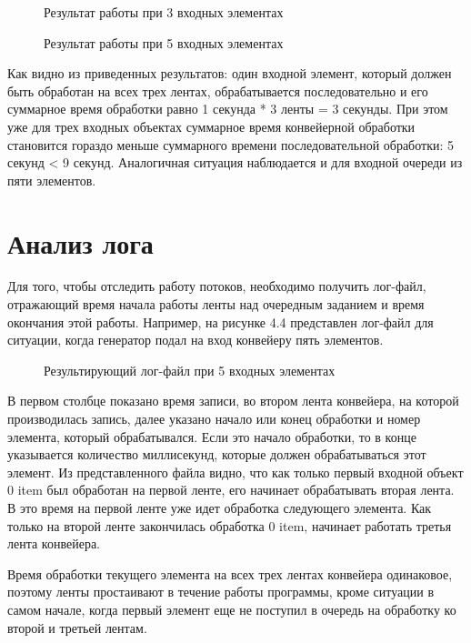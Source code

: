 \documentclass[a4paper,12pt]{report}
\begin{document}
\begin{figure}[ht!]
\caption{Результат работы при 3 входных элементах}
\end{figure}

\begin{figure}[ht!]
\caption{Результат работы при 5 входных элементах}
\end{figure}

Как видно из приведенных результатов: один входной элемент, который должен быть обработан на всех трех лентах, обрабатывается последовательно и его суммарное время обработки равно 1 секунда * 3 ленты = 3 секунды. При этом уже для трех входных объектах суммарное время конвейерной обработки становится гораздо меньше суммарного времени последовательной обработки: 5 секунд < 9 секунд. Аналогичная ситуация наблюдается и для входной очереди из пяти элементов.

\section{Анализ лога}

\hspace{0.6cm}Для того, чтобы отследить работу потоков, необходимо получить лог-файл, отражающий время начала работы ленты над очередным заданием и время окончания этой работы. 
Например, на рисунке 4.4 представлен лог-файл для ситуации, когда генератор подал на вход конвейеру пять элементов.

\begin{figure}[ht!]
\caption{Результирующий лог-файл при 5 входных элементах}
\end{figure}

\hspace{0.6cm}В первом столбце показано время записи, во втором лента конвейера, на которой производилась запись, далее указано начало или конец обработки и номер элемента, который обрабатывался. Если это начало обработки, то в конце указывается количество миллисекунд, которые должен обрабатываться этот элемент. Из представленного файла видно, что как только первый входной объект 0 item был обработан на первой ленте, его начинает обрабатывать вторая лента. В это время на первой ленте уже идет обработка следующего элемента. Как только на второй ленте закончилась обработка 0 item, начинает работать третья лента конвейера. 

Время обработки текущего элемента на всех трех лентах конвейера одинаковое,  поэтому ленты простаивают в течение работы программы, кроме ситуации в самом начале, когда первый элемент еще не поступил в очередь на обработку ко второй и третьей лентам. 
\end{document}
